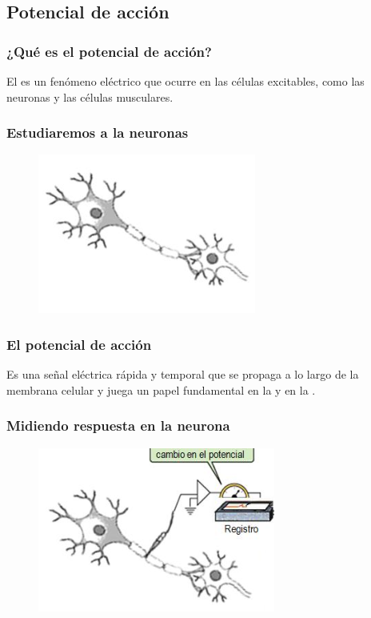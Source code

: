 \documentclass[14pt]{beamer}
\begin{document}
\subsection{Potencial de acción}

\begin{frame}
\frametitle{¿Qué es el potencial de acción?}
El  es un fenómeno eléctrico que ocurre en las células excitables, \pause como las neuronas y las células musculares.
\end{frame}
\begin{frame}
\frametitle{Estudiaremos a la neuronas}
\begin{figure}
    \centering
    \includegraphics[scale=1]{Imagenes/Potencial_Accion_02.png}
\end{figure}
\end{frame}
\begin{frame}
\frametitle{El potencial de acción}
Es una señal eléctrica rápida y temporal \pause que se propaga a lo largo de la membrana celular \pause y juega un papel fundamental en la  y en la .
\end{frame}
\begin{frame}
\frametitle{Midiendo respuesta en la neurona}
\begin{figure}
    \centering
    \includegraphics[scale=1]{Imagenes/Potencial_Accion_03.png}
\end{figure}
\end{frame}
\end{document}
